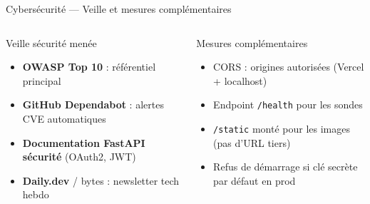 \documentclass[aspectratio=169,10pt]{beamer}
\begin{document}
\begin{frame}{Cybersécurité --- Veille et mesures complémentaires}
  \begin{columns}[T]
    \begin{block}{Veille sécurité menée}
      \begin{itemize}\small
        \item \textbf{OWASP Top 10} : référentiel principal
        \item \textbf{GitHub Dependabot} : alertes CVE automatiques
        \item \textbf{Documentation FastAPI sécurité} (OAuth2, JWT)
        \item \textbf{Daily.dev} / bytes : newsletter tech hebdo
      \end{itemize}
    \end{block}
    \hspace{0.06\textwidth}
    \begin{block}{Mesures complémentaires}
      \begin{itemize}\small
        \item CORS : origines autorisées (Vercel + localhost)
        \item Endpoint \texttt{/health} pour les sondes
        \item \texttt{/static} monté pour les images (pas d'URL tiers)
        \item Refus de démarrage si clé secrète par défaut en prod
      \end{itemize}
    \end{block}
  \end{columns}
\end{frame}
\end{document}
